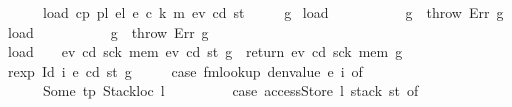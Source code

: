 \begin{isabellebody}
\ \ \ \ \ \ load\ cp\ pl\ el\ e\ c\ k\ m\ e\isactrlsub v\ cd\ st\isanewline
\ \ \ \ {\isacharbraceright}{\kern0pt}{\isacharparenright}{\kern0pt}\ g{\isachardoublequoteclose}\isanewline
{\isacharbar}{\kern0pt}\ {\isachardoublequoteopen}load\ {\isacharunderscore}{\kern0pt}\ {\isacharbrackleft}{\kern0pt}{\isacharbrackright}{\kern0pt}\ {\isacharparenleft}{\kern0pt}{\isacharunderscore}{\kern0pt}{\isacharhash}{\kern0pt}{\isacharunderscore}{\kern0pt}{\isacharparenright}{\kern0pt}\ {\isacharunderscore}{\kern0pt}\ {\isacharunderscore}{\kern0pt}\ {\isacharunderscore}{\kern0pt}\ {\isacharunderscore}{\kern0pt}\ {\isacharunderscore}{\kern0pt}\ {\isacharunderscore}{\kern0pt}\ {\isacharunderscore}{\kern0pt}\ g\ {\isacharequal}{\kern0pt}\ throw\ Err\ g{\isachardoublequoteclose}\isanewline
{\isacharbar}{\kern0pt}\ {\isachardoublequoteopen}load\ {\isacharunderscore}{\kern0pt}\ {\isacharparenleft}{\kern0pt}{\isacharunderscore}{\kern0pt}{\isacharhash}{\kern0pt}{\isacharunderscore}{\kern0pt}{\isacharparenright}{\kern0pt}\ {\isacharbrackleft}{\kern0pt}{\isacharbrackright}{\kern0pt}\ {\isacharunderscore}{\kern0pt}\ {\isacharunderscore}{\kern0pt}\ {\isacharunderscore}{\kern0pt}\ {\isacharunderscore}{\kern0pt}\ {\isacharunderscore}{\kern0pt}\ {\isacharunderscore}{\kern0pt}\ {\isacharunderscore}{\kern0pt}\ g\ {\isacharequal}{\kern0pt}\ throw\ Err\ g{\isachardoublequoteclose}\isanewline
{\isacharbar}{\kern0pt}\ {\isachardoublequoteopen}load\ {\isacharunderscore}{\kern0pt}\ {\isacharbrackleft}{\kern0pt}{\isacharbrackright}{\kern0pt}\ {\isacharbrackleft}{\kern0pt}{\isacharbrackright}{\kern0pt}\ e\isactrlsub v{\isacharprime}{\kern0pt}\ cd{\isacharprime}{\kern0pt}\ sck{\isacharprime}{\kern0pt}\ mem{\isacharprime}{\kern0pt}\ e\isactrlsub v\ cd\ st\ g\ {\isacharequal}{\kern0pt}\ return\ {\isacharparenleft}{\kern0pt}e\isactrlsub v{\isacharprime}{\kern0pt}{\isacharcomma}{\kern0pt}\ cd{\isacharprime}{\kern0pt}{\isacharcomma}{\kern0pt}\ sck{\isacharprime}{\kern0pt}{\isacharcomma}{\kern0pt}\ mem{\isacharprime}{\kern0pt}{\isacharparenright}{\kern0pt}\ g{\isachardoublequoteclose}\isanewline
\isanewline
\isanewline
{\isacharbar}{\kern0pt}\ {\isachardoublequoteopen}rexp\ {\isacharparenleft}{\kern0pt}Id\ i{\isacharparenright}{\kern0pt}\ e\ cd\ st\ g\ {\isacharequal}{\kern0pt}\isanewline
\ \ \ \ {\isacharparenleft}{\kern0pt}case\ fmlookup\ {\isacharparenleft}{\kern0pt}denvalue\ e{\isacharparenright}{\kern0pt}\ i\ of\isanewline
\ \ \ \ \ \ Some\ {\isacharparenleft}{\kern0pt}tp{\isacharcomma}{\kern0pt}\ Stackloc\ l{\isacharparenright}{\kern0pt}\ {\isasymRightarrow}\isanewline
\ \ \ \ \ \ \ \ {\isacharparenleft}{\kern0pt}case\ accessStore\ l\ {\isacharparenleft}{\kern0pt}stack\ st{\isacharparenright}{\kern0pt}\ of\isanewline

\end{isabellebody}
